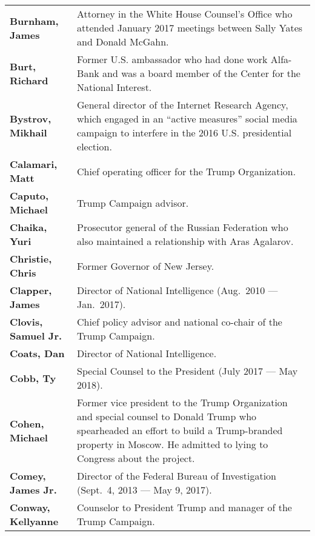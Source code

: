\begin{longtable}{ p{} p{} }
    \textbf{Burnham, James} & Attorney in the White House Counsel’s Office who attended January 2017 meetings between Sally Yates and Donald McGahn. \\

    \textbf{Burt, Richard} & Former U.S. ambassador who had done work Alfa-Bank and was a board member of the Center for the National Interest. \\

    \textbf{Bystrov, Mikhail} & General director of the Internet Research Agency, which engaged in an “active measures” social media campaign to interfere in the 2016 U.S. presidential election. \\

    \textbf{Calamari, Matt} & Chief operating officer for the Trump Organization. \\

    \textbf{Caputo, Michael} & Trump Campaign advisor. \\

    \textbf{Chaika, Yuri} & Prosecutor general of the Russian Federation who also maintained a relationship with Aras Agalarov. \\

    \textbf{Christie, Chris} & Former Governor of New Jersey. \\

    \textbf{Clapper, James} & Director of National Intelligence (Aug.~2010 — Jan.~2017). \\

    \textbf{Clovis, Samuel Jr.} & Chief policy advisor and national co-chair of the Trump Campaign. \\

    \textbf{Coats, Dan} & Director of National Intelligence. \\

    \textbf{Cobb, Ty} & Special Counsel to the President (July 2017 — May 2018). \\

    \textbf{Cohen, Michael} & Former vice president to the Trump Organization and special counsel to Donald Trump who spearheaded an effort to build a Trump-branded property in Moscow. He admitted to lying to Congress about the project. \\

    \textbf{Comey, James Jr.} & Director of the Federal Bureau of Investigation (Sept.~4, 2013 — May 9, 2017). \\

    \textbf{Conway, Kellyanne} & Counselor to President Trump and manager of the Trump Campaign. \\


\end{longtable}
